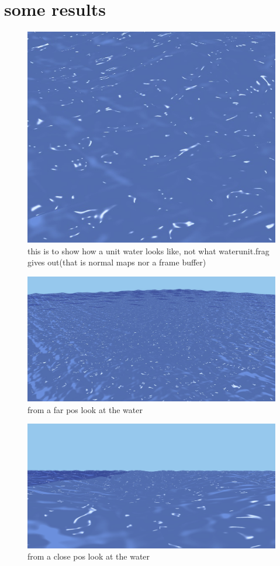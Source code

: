 \documentclass[12pt,letterpaper]{article}
\begin{document}
\section{some results}
\begin{figure}[p]
    \centering
    \includegraphics[width=1.0\textwidth]{unitwater.jpg}
    \caption{this is to show how a unit water looks like, not what waterunit.frag gives out(that is normal maps nor a frame buffer)}
\end{figure}
\begin{figure}[p]
    \centering
    \includegraphics[width=1.0\textwidth]{wideview.jpg}
    \caption{from a far pos look at the water}
\end{figure}
\begin{figure}[p]
    \centering
    \includegraphics[width=1.0\textwidth]{closeview.jpg}
    \caption{from a close pos look at the water}
\end{figure}
\end{document}
